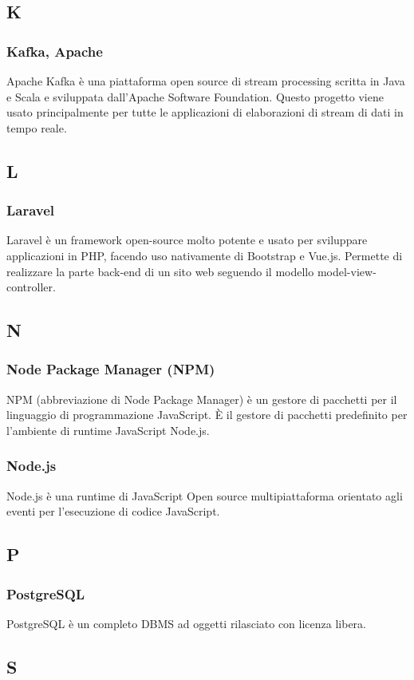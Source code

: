 \subsection{K}
\subsubsection{Kafka, Apache}  Apache Kafka è una piattaforma open source di stream processing scritta in Java e Scala e sviluppata dall'Apache Software Foundation.  Questo progetto viene usato principalmente per tutte le applicazioni di elaborazioni di stream di dati in tempo reale.
\subsection{L}
\subsubsection{Laravel}  Laravel è un framework open-source molto potente e usato per sviluppare applicazioni in PHP, facendo uso nativamente di Bootstrap e Vue.js. Permette di realizzare la parte back-end di un sito web seguendo il modello model-view-controller. 
\subsection{N}
\subsubsection{Node Package Manager (NPM)}  NPM (abbreviazione di Node Package Manager) è un gestore di pacchetti per il linguaggio di programmazione JavaScript. È il gestore di pacchetti predefinito per l'ambiente di runtime JavaScript Node.js.
\subsubsection{Node.js}  Node.js è una runtime di JavaScript Open source multipiattaforma orientato agli eventi per l'esecuzione di codice JavaScript.
\subsection{P}
\subsubsection{PostgreSQL}  PostgreSQL è un completo DBMS ad oggetti rilasciato con licenza libera.
\subsection{S}
